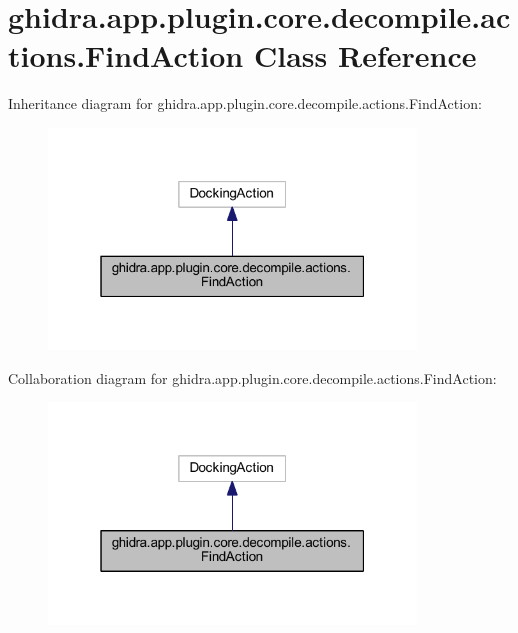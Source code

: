 \hypertarget{classghidra_1_1app_1_1plugin_1_1core_1_1decompile_1_1actions_1_1_find_action}{}\section{ghidra.\+app.\+plugin.\+core.\+decompile.\+actions.\+Find\+Action Class Reference}
\label{classghidra_1_1app_1_1plugin_1_1core_1_1decompile_1_1actions_1_1_find_action}


Inheritance diagram for ghidra.\+app.\+plugin.\+core.\+decompile.\+actions.\+Find\+Action\+:
\nopagebreak
\begin{figure}[H]
\begin{center}
\leavevmode
\includegraphics[width=277pt]{classghidra_1_1app_1_1plugin_1_1core_1_1decompile_1_1actions_1_1_find_action__inherit__graph}
\end{center}
\end{figure}


Collaboration diagram for ghidra.\+app.\+plugin.\+core.\+decompile.\+actions.\+Find\+Action\+:
\nopagebreak
\begin{figure}[H]
\begin{center}
\leavevmode
\includegraphics[width=277pt]{classghidra_1_1app_1_1plugin_1_1core_1_1decompile_1_1actions_1_1_find_action__coll__graph}
\end{center}
\end{figure}

